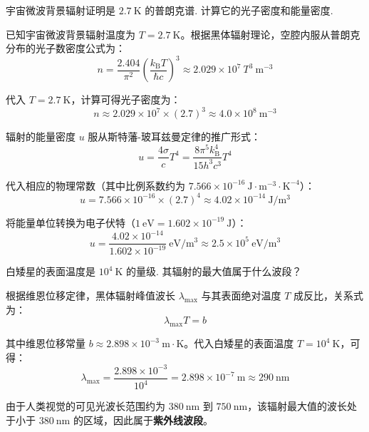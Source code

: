 \begin{exercise}\label{ex:22.1}
宇宙微波背景辐射证明是 $2.7 \ \mathrm{K}$ 的普朗克谱. 计算它的光子密度和能量密度.
\end{exercise}
\begin{solution}
已知宇宙微波背景辐射温度为 $T = 2.7 \ \mathrm{K}$。根据黑体辐射理论，空腔内服从普朗克分布的光子数密度公式为：
$$ n = \frac{2.404}{\pi^2} \left( \frac{k_{\mathrm{B}} T}{\hbar c} \right)^3 \approx 2.029 \times 10^7 \ T^3 \ \mathrm{m^{-3}} $$

代入 $T = 2.7 \ \mathrm{K}$，计算可得光子密度为：
$$ n \approx 2.029 \times 10^7 \times (2.7)^3 \approx 4.0 \times 10^8 \ \mathrm{m^{-3}} $$

辐射的能量密度 $u$ 服从斯特藩-玻耳兹曼定律的推广形式：
$$ u = \frac{4\sigma}{c} T^4 = \frac{8\pi^5 k_{\mathrm{B}}^4}{15 h^3 c^3} T^4 $$

代入相应的物理常数（其中比例系数约为 $7.566 \times 10^{-16} \ \mathrm{J \cdot m^{-3} \cdot K^{-4}}$）：
$$ u = 7.566 \times 10^{-16} \times (2.7)^4 \approx 4.02 \times 10^{-14} \ \mathrm{J/m^3} $$

将能量单位转换为电子伏特（$1 \ \mathrm{eV} = 1.602 \times 10^{-19} \ \mathrm{J}$）：
$$ u = \frac{4.02 \times 10^{-14}}{1.602 \times 10^{-19}} \ \mathrm{eV/m^3} \approx 2.5 \times 10^5 \ \mathrm{eV/m^3} $$
\end{solution}

\begin{exercise}\label{ex:22.2}
白矮星的表面温度是 $10^4 \ \mathrm{K}$ 的量级. 其辐射的最大值属于什么波段？
\end{exercise}
\begin{solution}
根据维恩位移定律，黑体辐射峰值波长 $\lambda_{\max}$ 与其表面绝对温度 $T$ 成反比，关系式为：
$$ \lambda_{\max} T = b $$

其中维恩位移常量 $b \approx 2.898 \times 10^{-3} \ \mathrm{m \cdot K}$。代入白矮星的表面温度 $T = 10^4 \ \mathrm{K}$，可得：
$$ \lambda_{\max} = \frac{2.898 \times 10^{-3}}{10^4} = 2.898 \times 10^{-7} \ \mathrm{m} \approx 290 \ \mathrm{nm} $$

由于人类视觉的可见光波长范围约为 $380 \ \mathrm{nm}$ 到 $750 \ \mathrm{nm}$，该辐射最大值的波长处于小于 $380 \ \mathrm{nm}$ 的区域，因此属于\textbf{紫外线波段}。
\end{solution}

